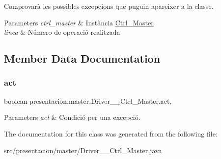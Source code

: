 Comprovarà les possibles excepcions que puguin apareixer a la classe. 


\begin{DoxyParams}{Parameters}
{\em ctrl\+\_\+master} & Instància \hyperlink{classpresentacion_1_1master_1_1Ctrl__Master}{Ctrl\+\_\+\+Master} \\
\hline
{\em linea} & Número de operació realitzada \\
\hline
\end{DoxyParams}


\subsection{Member Data Documentation}
\mbox{\label{classpresentacion_1_1master_1_1Driver____Ctrl__Master_a76b217371c1036ed3e4e46d2c8d427c4}} 
\subsubsection{\texorpdfstring{act}{act}}
{\footnotesize\ttfamily boolean presentacion.\+master.\+Driver\+\_\+\+\_\+\+Ctrl\+\_\+\+Master.\+act\hspace{0.3cm}{\ttfamily [static]}, {\ttfamily [private]}}


\begin{DoxyParams}{Parameters}
{\em act} & Condició per una excepció. \\
\hline
\end{DoxyParams}


The documentation for this class was generated from the following file\+:\begin{DoxyCompactItemize}
\item 
src/presentacion/master/Driver\+\_\+\+\_\+\+Ctrl\+\_\+\+Master.\+java\end{DoxyCompactItemize}
